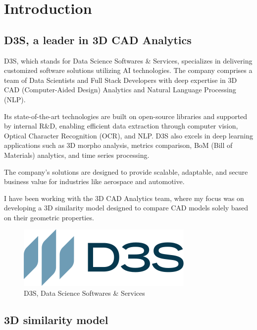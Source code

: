 \chapter{Introduction}
\label{chap:introduction}


\section{D3S, a leader in 3D CAD Analytics}

D3S, which stands for Data Science Softwares \& Services, specializes in delivering customized software solutions utilizing AI technologies. The company comprises a team of Data Scientists and Full Stack Developers with deep expertise in 3D CAD (Computer-Aided Design) Analytics and Natural Language Processing (NLP).  

Its state-of-the-art technologies are built on open-source libraries and supported by internal R\&D, enabling efficient data extraction through computer vision, Optical Character Recognition (OCR), and NLP. D3S also excels in deep learning applications such as 3D morpho analysis, metrics comparison, BoM (Bill of Materials) analytics, and time series processing. 

The company’s solutions are designed to provide scalable, adaptable, and secure business value for industries like aerospace and automotive.

\vspace{0.5cm}

I have been working with the 3D CAD Analytics team, where my focus was on developing a 3D similarity model designed to compare CAD models solely based on their geometric properties.

\begin{figure}[]
    \centering
    \includegraphics[width=0.3\columnwidth]{images/d3s_logo.png}
    \caption{D3S, Data Science Softwares \& Services}
    \label{fig:d3s_logo}
\end{figure}

\section{3D similarity model}

